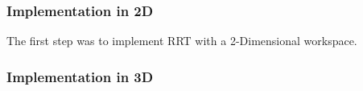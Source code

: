     \subsubsection{Implementation in 2D}
    The first step was to implement RRT with a 2-Dimensional workspace. 
    

    \subsubsection{Implementation in 3D}
    

